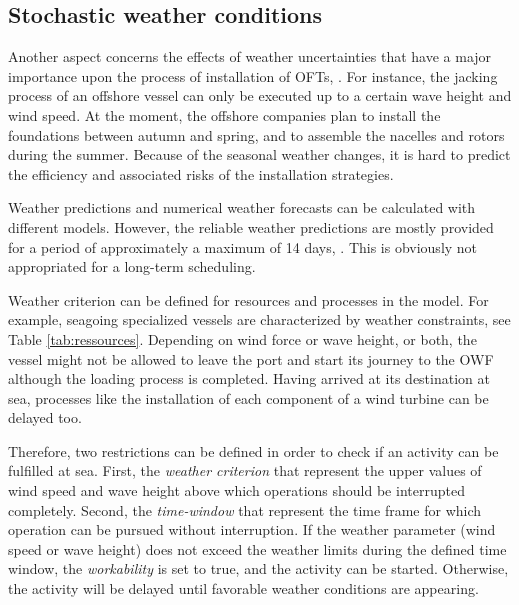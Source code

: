 \subsection{Stochastic weather conditions}
Another aspect concerns the effects of weather uncertainties that have a major importance upon the process of installation of OFTs, \cite{COMPIT11}. For instance, the jacking process of an offshore vessel can only be executed up to a certain wave height and wind speed. At the moment, the offshore companies plan to install the foundations between autumn and spring, and to assemble the nacelles and rotors during the summer. Because of the seasonal weather changes, it is hard to predict the efficiency and associated risks of the installation strategies.

Weather predictions and numerical weather forecasts can be calculated with different models. However, the reliable weather predictions are mostly provided for a period of approximately a maximum of 14 days, \cite{hinnenthal2007}. This is obviously not appropriated for a long-term scheduling.

Weather criterion can be defined for resources and processes in the model. For example, seagoing specialized vessels are characterized by weather constraints, see Table \ref{tab:ressources}. Depending on wind force or wave height, or both, the vessel might not be allowed to leave the port and start its journey to the OWF although the loading process is completed. Having arrived at its destination at sea, processes like the installation of each component of a wind turbine can be delayed too.

Therefore, two restrictions can be defined in order to check if an activity can be fulfilled at sea. First, the \textit{weather criterion} that represent the upper values of wind speed and wave height above which operations should be interrupted completely. Second, the \textit{time-window} that represent the time frame for which operation can be pursued without interruption.  If the weather parameter (wind speed or wave height) does not exceed the weather limits during the defined time window, the \textit{workability} is set to true, and the activity can be started. Otherwise, the activity will be delayed until favorable weather conditions are appearing.

